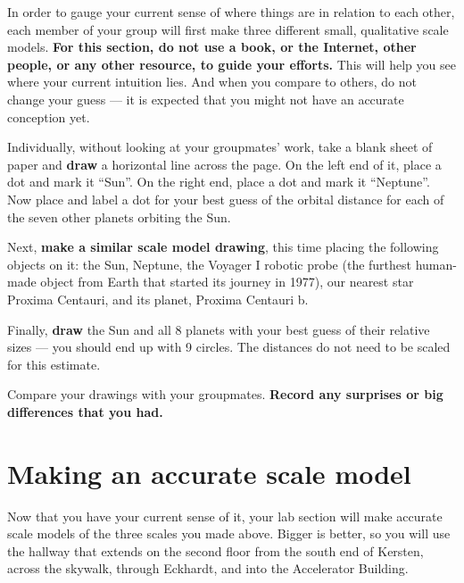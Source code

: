In order to gauge your current sense of where things are in relation to each other, each member of your group will first make three different small, qualitative scale models. \textbf{For this section, do not use a book, or the Internet, other people, or any other resource, to guide your efforts.} This will help you see where your current intuition lies. And when you compare to others, do not change your guess --- it is expected that you might not have an accurate conception yet.

\begin{steps}
	\item Individually, without looking at your groupmates' work, take a blank sheet of paper and \textbf{draw} a horizontal line across the page. On the left end of it, place a dot and mark it ``Sun''. On the right end, place a dot and mark it ``Neptune''. Now place and label a dot for your best guess of the orbital distance for each of the seven other planets orbiting the Sun.

	\item Next, \textbf{make a similar scale model drawing}, this time placing the following objects on it: the Sun, Neptune, the Voyager I robotic probe (the furthest human-made object from Earth that started its journey in 1977), our nearest star Proxima Centauri, and its planet, Proxima Centauri b.
	
	\item Finally, \textbf{draw} the Sun and all 8 planets with your best guess of their relative sizes --- you should end up with 9 circles. The distances do not need to be scaled for this estimate.

	\item Compare your drawings with your groupmates. \textbf{Record any surprises or big differences that you had.}
\end{steps}

\section{Making an accurate scale model}\label{se:sec:model}

Now that you have your current sense of it, your lab section will make accurate scale models of the three scales you made above. Bigger is better, so 
you will use the hallway that extends on the second floor from the south end of Kersten, across the skywalk, through Eckhardt, and into the Accelerator Building.

